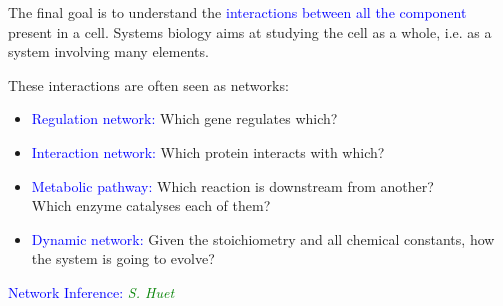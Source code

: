 \documentclass[dvips, lscape]{foils}
\newcommand{\textblue}[1]{\textcolor{blue}{#1}}
\newcommand{\textgreen}[1]{\textcolor{green}{ #1}}
\newcommand{\refer}[2]{\textgreen{\sl #1}}
\newcommand{\emphase}[1]{\textblue{#1}}
\newcommand{\section}[1]{
  \addtocounter{section}{1}
  \setcounter{subsection}{0}
  {\centerline{\Large \textblue{#1}}}
  }
\newcommand{\subsection}[1]{
  \addtocounter{subsection}{1}
  {\noindent{\large \textblue{#1}}}
  }
\begin{document}
\noindent The final goal is to understand the \emphase{interactions
  between all the component} present in a cell. Systems biology aims
at studying the cell as a whole, i.e. as a system involving many
elements.  

These interactions are often seen as networks:
\begin{itemize}
\item \vspace{-0.5cm} \emphase{Regulation network:} Which gene regulates which?
\item \vspace{-0.5cm} \emphase{Interaction network:} Which protein interacts
  with which?
\item \vspace{-0.5cm} \emphase{Metabolic pathway:} Which reaction is downstream
  from another? \\
  Which enzyme catalyses each of them?
\item \vspace{-0.5cm} \emphase{Dynamic network:} Given the
  stoichiometry and all chemical constants, how the system is going to
  evolve?
\end{itemize}


\newpage
\subsection{A metabolic pathway}

\noindent{} 

\newpage
\section{Network Inference: \refer{S. Huet}{}}
\end{document}

